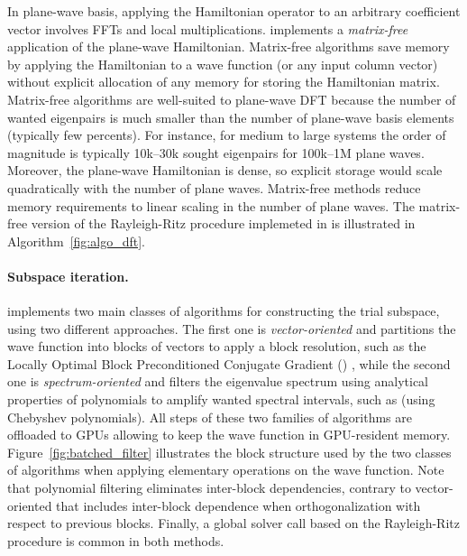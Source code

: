 \documentclass[twocolumn,superscriptaddress]{revtex4-1}
\begin{document}
In plane-wave basis, applying the Hamiltonian operator to an arbitrary coefficient vector involves FFTs and local multiplications. \abinit implements a \textit{matrix-free} application of the plane-wave Hamiltonian. Matrix-free algorithms save memory by applying the Hamiltonian to a wave function (or any input column vector) without explicit allocation of any memory for storing the Hamiltonian matrix. Matrix-free algorithms are well-suited to plane-wave DFT because the number of wanted eigenpairs is much smaller than the number of plane-wave basis elements (typically few percents). For instance, for medium to large systems the order of magnitude is typically 10k–30k sought eigenpairs for 100k–1M plane waves. Moreover, the plane-wave Hamiltonian is dense, so explicit storage would scale quadratically with the number of plane waves. Matrix-free methods reduce memory requirements to linear scaling in the number of plane waves. The matrix-free version of the Rayleigh-Ritz procedure implemeted in \abinit is illustrated in Algorithm~\ref{fig:algo_dft}.

\paragraph{Subspace iteration.}

\abinit implements two main classes of algorithms for constructing the trial subspace, using two different approaches. The first one is \textit{vector-oriented} and partitions the wave function into blocks of vectors to apply a block resolution, such as the Locally Optimal Block Preconditioned Conjugate Gradient (\lobpcg) \cite{BOTTIN2008329}, while the second one is \textit{spectrum-oriented} and filters the eigenvalue spectrum using analytical properties of polynomials to amplify wanted spectral intervals, such as \chebyshevfiltering \cite{LEVITT201598} (using Chebyshev polynomials). All steps of these two families of algorithms are offloaded to GPUs allowing to keep the wave function in GPU-resident memory. Figure~\ref{fig:batched_filter} illustrates the block structure used by the two classes of algorithms when applying elementary operations on the wave function. Note that polynomial filtering eliminates inter-block dependencies, contrary to vector-oriented \lobpcg that includes inter-block dependence when orthogonalization with respect to previous blocks. Finally, a global solver call based on the Rayleigh-Ritz procedure is common in both methods.
\end{document}
